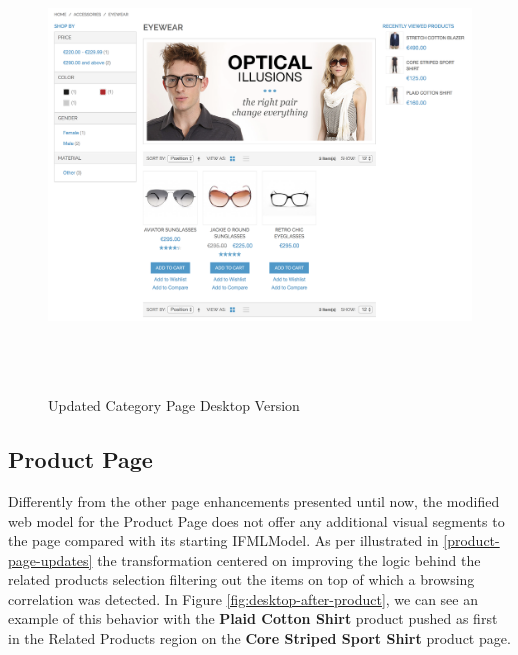 \begin{figure}[H]
  \centering
    \includegraphics[height=12cm]{images/diagrams/after/desktop-category.png}
  \caption{Updated Category Page Desktop Version}
  \label{fig:desktop-after-category}
\end{figure}
\vspace{0.5cm}

\newpage
\subsection{Product Page}

Differently from the other page enhancements presented until now, the modified web model for the Product Page does not offer any additional visual segments to the page compared with its starting IFMLModel. As per illustrated in \ref{product-page-updates} the transformation centered on improving the logic behind the related products selection filtering out the items on top of which a browsing correlation was detected. In Figure \ref{fig:desktop-after-product}, we can see an example of this behavior with the \textbf{Plaid Cotton Shirt} product pushed as first in the Related Products region on the \textbf{Core Striped Sport Shirt} product page.

